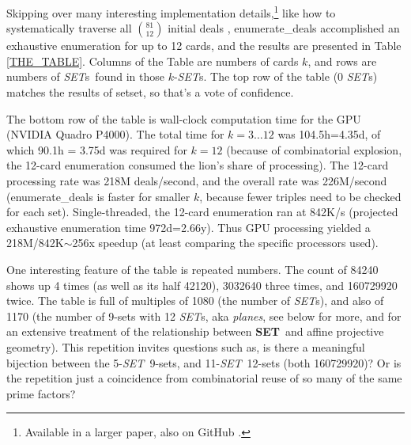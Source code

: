\documentclass{article}
\newcommand{\SET}{{\em SET}}
\newcommand{\SETs}{{\em SET}s}
\newcommand{\SETg}{{\bf SET}}
\newcommand{\SETSET}{{\sc setset}}
\newcommand{\EDb}{{\sc enumerate\_deals }}
\begin{document}
Skipping over many interesting implementation details,\footnote{Available in a
larger paper, also on GitHub \cite{ME}.} like how to systematically traverse all
$\binom{81}{12}$ initial deals \cite{WIKI}, \EDb accomplished an exhaustive
enumeration for up to 12 cards, and the results are presented in Table
\ref{THE_TABLE}. Columns of the Table are numbers of cards $k$, and rows are
numbers of \SETs~found in those $k$-\SETs.  The top row of the table (0 \SETs)
matches the results of \SETSET, so that's a vote of confidence.

The bottom row of the table is wall-clock computation time for the GPU (NVIDIA
Quadro P4000). The total time for $k=3\ldots 12$ was 104.5h=4.35d, of which
90.1h = 3.75d was required for $k=12$ (because of combinatorial explosion, the
12-card enumeration consumed the lion's share of processing). The 12-card
processing rate was 218M deals/second, and the overall rate was 226M/second
(\EDb is faster for smaller $k$, because fewer triples need to be checked for
each set). Single-threaded, the 12-card enumeration ran at 842K/s (projected
exhaustive enumeration time 972d=2.66y). Thus GPU processing yielded a
218M/842K$\sim$256x speedup (at least comparing the specific processors used).

One interesting feature of the table is repeated numbers. The count of 84240
shows up 4 times (as well as its half 42120), 3032640 three times, and 160729920
twice. The table is full of multiples of 1080 (the number of \SETs), and also of
1170 (the number of 9-sets with 12 \SETs, aka {\em planes}, see below for more,
and \cite{JOS} for an extensive treatment of the relationship between \SETg~and
affine projective geometry). This repetition invites questions such as, is there
a meaningful bijection between the 5-\SET~9-sets, and 11-\SET~12-sets (both
160729920)? Or is the repetition just a coincidence from combinatorial reuse of
so many of the same prime factors?

\end{document}
